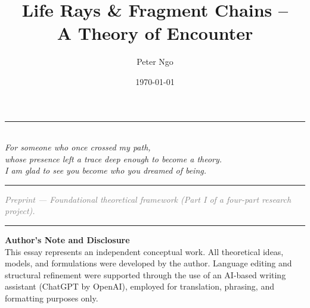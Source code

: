 \documentclass[12pt,a4paper]{article}
\title{\textbf{Life Rays \& Fragment Chains --\\
A Theory of Encounter}}
\author{Peter Ngo}
\date{\today}
\begin{document}
\maketitle

\vspace{1.5em}
\begin{center}
\rule{0.45\textwidth}{0.4pt}\\[1em]
\textit{
For someone who once crossed my path,\\[0.4em]
whose presence left a trace deep enough to become a theory.\\[0.4em]
I am glad to see you become who you dreamed of being.}\\[1em]
\rule{0.45\textwidth}{0.4pt}
\end{center}
\vspace{2em}

\tableofcontents
\newpage
\onehalfspacing



\vspace{1em}
\begin{center}
\textcolor{gray}{\small \textit{Preprint — Foundational theoretical framework (Part I of a four-part research project).}}
\end{center}
\vspace{1em}









\vspace{4em}
\noindent\rule{\textwidth}{0.4pt}
\vspace{1em}
\footnotesize
\noindent\textbf{Author’s Note and Disclosure} \\
This essay represents an independent conceptual work.
All theoretical ideas, models, and formulations were developed by the author.
Language editing and structural refinement were supported through the use of an AI-based writing assistant (ChatGPT by OpenAI),
employed for translation, phrasing, and formatting purposes only.
\normalsize
\vspace{2em}

\newpage



\clearpage
{}
{}

\printindex
\end{document}
